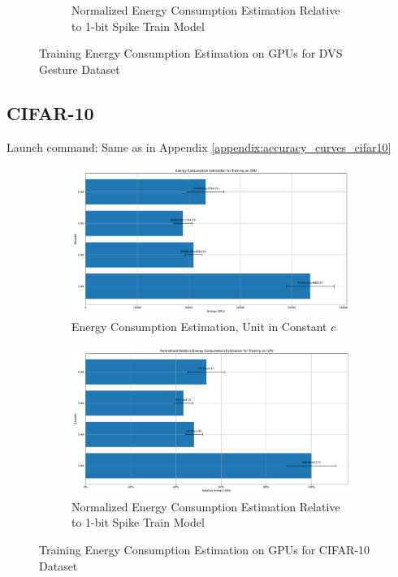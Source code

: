 \begin{figure}[H]
\begin{subfigure}[H]{0.48\textwidth}
                \caption{Normalized Energy Consumption Estimation Relative to 1-bit Spike Train Model}
            \end{subfigure}
            \caption{Training Energy Consumption Estimation on GPUs for DVS Gesture Dataset}
        \end{figure}

    \subsection{CIFAR-10}
    \label{appendix:energy_gpu_cifar10}
        Launch command: Same as in Appendix \ref{appendix:accuracy_curves_cifar10}

        \begin{figure}[H]
            \centering
            \begin{subfigure}[H]{0.48\textwidth}
                \includegraphics[width=\textwidth]{../standard/CIFAR10/plots/cifar10_train_energy_gpu.pdf}
                \caption{Energy Consumption Estimation, Unit in Constant $c$}
            \end{subfigure}
            \hfill
            \begin{subfigure}[H]{0.48\textwidth}
                \includegraphics[width=\textwidth]{../standard/CIFAR10/plots/cifar10_train_relative_energy_gpu.pdf}
                \caption{Normalized Energy Consumption Estimation Relative to 1-bit Spike Train Model}
            \end{subfigure}
            \caption{Training Energy Consumption Estimation on GPUs for CIFAR-10 Dataset}
        \end{figure}

